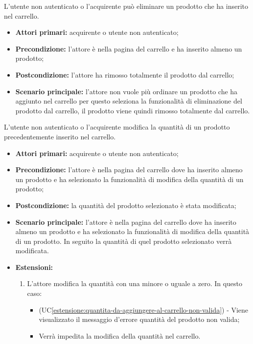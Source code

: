 
\label{eliminazione-prodotto-dal-carrello}

L'utente non autenticato o l'acquirente può eliminare un prodotto che ha inserito nel carrello.
\begin{itemize}
    \item \textbf{Attori primari:} acquirente o utente non autenticato;
    \item \textbf{Precondizione:} l'attore è nella pagina del carrello e ha inserito almeno un prodotto;
    \item \textbf{Postcondizione:} l'attore ha rimosso totalmente il prodotto dal carrello;
    \item \textbf{Scenario principale:} l'attore non vuole più ordinare un prodotto che ha aggiunto nel carrello per questo seleziona la funzionalità di eliminazione del prodotto dal carrello, il prodotto viene quindi rimosso totalmente dal carrello.
\end{itemize}


\label{modifica-quantita-nel-carrello}

L'utente non autenticato o l'acquirente modifica la quantità di un prodotto precedentemente inserito nel carrello.
\begin{itemize}
    \item \textbf{Attori primari:} acquirente o utente non autenticato;
    \item \textbf{Precondizione:} l'attore è nella pagina del carrello dove ha inserito almeno un prodotto e ha selezionato la funzionalità di modifica della quantità di un prodotto;
    \item \textbf{Postcondizione:} la quantità del prodotto selezionato è stata modificata;
    \item \textbf{Scenario principale:} l'attore è nella pagina del carrello dove ha inserito almeno un prodotto e ha selezionato la funzionalità di modifica della quantità di un prodotto. In seguito la quantità di quel prodotto selezionato verrà modificata.
    \item \textbf{Estensioni:}
    \begin{enumerate}[label=\lett]
        \item L'attore modifica la quantità con una minore o uguale a zero. In questo caso:
        \begin{itemize}
            \item (UC\ref{estensione:quantita-da-aggiungere-al-carrello-non-valida}) - Viene visualizzato il messaggio d'errore quantità del prodotto non valida;
            \item Verrà impedita la modifica della quantità nel carrello.
        \end{itemize}
    \end{enumerate}
\end{itemize}

